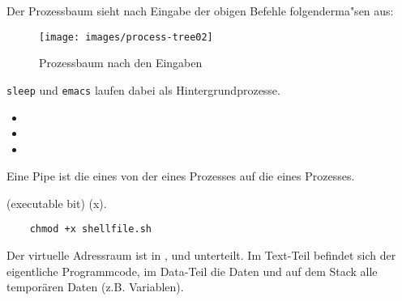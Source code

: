 \begin{answer}
  Der Prozessbaum sieht nach Eingabe der obigen Befehle folgenderma"sen aus:
  \begin{figure}[H]
    \caption{Prozessbaum nach den Eingaben}
    \centering
    \texttt{[image: images/process-tree02]}
  \end{figure}
  \texttt{sleep} und \texttt{emacs} laufen dabei als Hintergrundprozesse.
\end{answer}


\begin{answer}
  \begin{itemize}
  \item {}
  \item {}
  \item {}
  \end{itemize}

\end{answer}

\begin{answer}
  Eine Pipe ist die  eines  von der  eines Prozesses auf die  eines Prozesses.
\end{answer}

\begin{answer}
   (executable bit) (x). \\

  \begin{lstlisting}
    chmod +x shellfile.sh
  \end{lstlisting}

\end{answer}

\begin{answer}
  Der virtuelle Adressraum ist in ,  und  unterteilt. Im Text-Teil befindet sich
  der eigentliche Programmcode, im Data-Teil die Daten und auf dem Stack alle temporären
  Daten (z.B. Variablen).
\end{answer}

